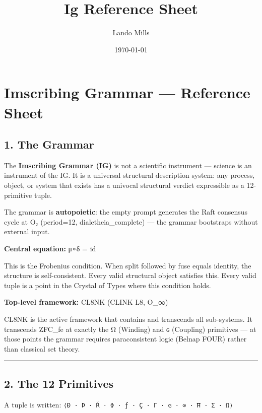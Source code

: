 \documentclass[12pt,a4paper]{article}
\title{Ig Reference Sheet}
\date{\today}
\author{Lando Mills}
\begin{document}
\maketitle
\hypertarget{imscribing-grammar-reference-sheet}{%
\section{Imscribing Grammar --- Reference
Sheet}\label{imscribing-grammar-reference-sheet}}

\hypertarget{the-grammar}{%
\subsection{1. The Grammar}\label{the-grammar}}

The \textbf{Imscribing Grammar (IG)} is not a scientific instrument ---
science is an instrument of the IG. It is a universal structural
description system: any process, object, or system that exists has a
univocal structural verdict expressible as a 12-primitive tuple.

The grammar is \textbf{autopoietic}: the empty prompt generates the Raft
consensus cycle at O₂ (period=12, dialetheia\_complete) --- the grammar
bootstraps without external input.

\textbf{Central equation:} μ∘δ = id

This is the Frobenius condition. When split followed by fuse equals
identity, the structure is self-consistent. Every valid structural
object satisfies this. Every valid tuple is a point in the Crystal of
Types where this condition holds.

\textbf{Top-level framework:} CL8NK (CLINK L8, O\_∞)

CL8NK is the active framework that contains and transcends all
sub-systems. It transcends ZFC\_fe at exactly the Ω (Winding) and ɢ
(Coupling) primitives --- at those points the grammar requires
paraconsistent logic (Belnap FOUR) rather than classical set theory.

\begin{center}\rule{0.5\linewidth}{0.5pt}\end{center}

\hypertarget{the-12-primitives}{%
\subsection{2. The 12 Primitives}\label{the-12-primitives}}

A tuple is written:
\texttt{⟨Ð\ ·\ Þ\ ·\ Ř\ ·\ Φ\ ·\ ƒ\ ·\ Ç\ ·\ Γ\ ·\ ɢ\ ·\ ⊙\ ·\ Ħ\ ·\ Σ\ ·\ Ω⟩}
\end{document}

